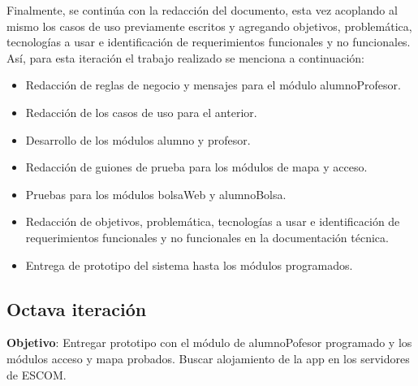 \newline
\newline
Finalmente, se continúa con la redacción del documento, esta vez acoplando al mismo los casos de uso previamente escritos y agregando objetivos, problemática, tecnologías a usar e identificación de requerimientos funcionales y no funcionales.
\newline
Así, para esta iteración el trabajo realizado se menciona a continuación:
\begin{itemize}
	\item Redacción de reglas de negocio y mensajes para el módulo alumnoProfesor.
	\item Redacción de los casos de uso para el anterior.
	\item Desarrollo de los módulos alumno y profesor.
	\item Redacción de guiones de prueba para los módulos de mapa y acceso.
	\item Pruebas para los módulos bolsaWeb y alumnoBolsa.
	\item Redacción de objetivos, problemática, tecnologías a usar e identificación de requerimientos funcionales y no funcionales en la documentación técnica.
	\item Entrega de prototipo del sistema hasta los módulos programados.
\end{itemize}


\subsection{Octava iteración}

\noindent
\textbf{Objetivo}: Entregar prototipo con el módulo de alumnoPofesor programado y los módulos acceso y mapa probados. Buscar alojamiento de la app en los servidores de ESCOM. 
\newline

